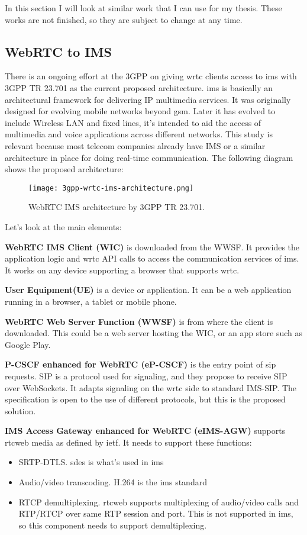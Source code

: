 In this section I will look at similar work that I can use for my thesis. These works are not finished, so they are subject to change at any time.

\subsection{WebRTC to IMS}
There is an ongoing effort at the 3GPP on giving \gls{wrtc} clients access to \gls{ims} with 3GPP TR 23.701\cite{3gpp-wrtc-access-ims} as the current proposed architecture. \gls{ims} is basically an architectural framework for delivering IP multimedia services. It was originally designed for evolving mobile networks beyond \gls{gsm}. Later it has evolved to include Wireless LAN and fixed lines, it's intended to aid the access of multimedia and voice applications across different networks. This study is relevant because most telecom companies already have IMS or a similar architecture in place for doing real-time communication. The following diagram shows the proposed architecture:

\begin{figure}[here]
\centerline{\texttt{[image: 3gpp-wrtc-ims-architecture.png]}}
\caption{WebRTC IMS architecture by 3GPP TR 23.701.}
\label{fig:wrtc-ims-architecture}
\end{figure}

Let's look at the main elements:

\textbf{WebRTC IMS Client (WIC)}
is downloaded from the WWSF. It provides the application logic and \gls{wrtc} API calls to access the communication services of \gls{ims}. It works on any device supporting a browser that supports \gls{wrtc}.

\textbf{User Equipment(UE)}
is a device or application. It can be a web application running in a browser, a tablet or mobile phone.

\textbf{WebRTC Web Server Function (WWSF)}
is from where the client is downloaded. This could be a web server hosting the WIC, or an app store such as Google Play.

\textbf{P-CSCF enhanced for WebRTC (eP-CSCF)}
is the entry point of \gls{sip} requests. SIP is a protocol used for signaling, and they propose to receive SIP over WebSockets. It adapts signaling on the \gls{wrtc} side to standard IMS-SIP. The specification is open to the use of different protocols, but this is the proposed solution.

\textbf{IMS Access Gateway enhanced for WebRTC (eIMS-AGW)}
supports \gls{rtcweb} media as defined by \gls{ietf}. It needs to support these functions:
\begin{itemize}
\item{SRTP-DTLS. \gls{sdes} is what's used in \gls{ims}}
\item{Audio/video transcoding. H.264 is the \gls{ims} standard}
\item{RTCP demultiplexing. \gls{rtcweb} supports multiplexing of audio/video calls and RTP/RTCP over same RTP session and port. This is not supported in \gls{ims}, so this component needs to support demultiplexing.}
\end{itemize}

